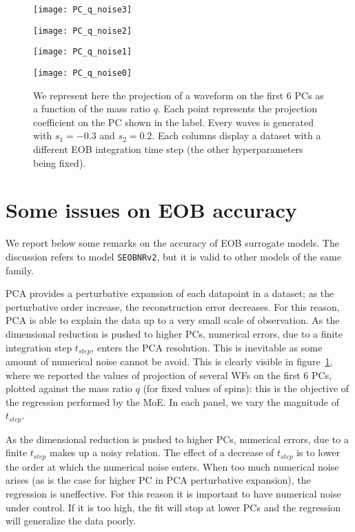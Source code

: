 \begin{figure}[t]
	\newcommand{\minipagesize}{0.5}
	\centering
    \begin{minipage}{\minipagesize\linewidth}
        \centering
        \texttt{[image: PC\_q\_noise3]}
    \end{minipage}\hfill
    \begin{minipage}{\minipagesize\linewidth}
        \centering
        \texttt{[image: PC\_q\_noise2]}
    \end{minipage}\vfill
    \begin{minipage}{\minipagesize\linewidth}
        \centering
        \texttt{[image: PC\_q\_noise1]}
    \end{minipage}\hfill
    \begin{minipage}{\minipagesize\linewidth}
        \centering
        \texttt{[image: PC\_q\_noise0]}
    \end{minipage}
	\caption{We represent here the projection of a waveform on the first 6 PCs as a function of the mass ratio $q$. Each point represents the projection coefficient on the PC shown in the label. Every waves is generated with $s_1 = -0.3$ and $s_2 = 0.2$.
Each columns display a dataset with a different EOB integration time step (the other hyperparameters being fixed).
}
	\label{fig:PC_q_noise}
\end{figure}

\section{Some issues on EOB accuracy}
We report below some remarks on the accuracy of EOB surrogate models. The discussion refers to model \texttt{SEOBNRv2}, but it is valid to other models of the same family.
\par
PCA provides a perturbative expansion of each datapoint in a dataset; as the perturbative order increase, the reconstruction error decreases. For this reason, PCA is able to explain the data up to a very small scale of observation.
As the dimensional reduction is pushed to higher PCs, numerical errors, due to a finite integration step $t_{step}$, enters the PCA resolution. This is inevitable as some amount of numerical noise cannot be avoid.
This is clearly visible in figure~\ref{fig:PC_q_noise}, where we reported the values of projection of several WFs on the first 6 PCs, plotted against the mass ratio $q$ (for fixed values of spins): this is the objective of the regression performed by the MoE. In each panel, we vary the magnitude of $t_{step}$.
\par
As the dimensional reduction is pushed to higher PCs, numerical errors, due to a finite $t_{step}$ makes up a noisy relation.
The effect of a decrease of $t_{step}$ is to lower the order at which the numerical noise enters.
When too much numerical noise arises (as is the case for higher PC in PCA perturbative expansion), the regression is uneffective. 
For this reason it is important to have numerical noise under control. If it is too high, the fit will stop at lower PCs and the regression will generalize the data poorly.
\par




